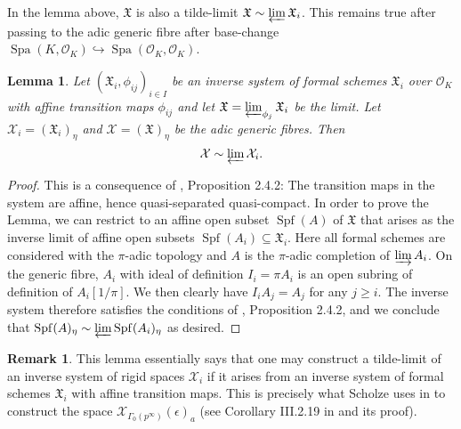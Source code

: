 \documentclass[10pt,oneside]{amsart}
\newtheorem{lemma}[theorem]{Lemma}
\theoremstyle{definition}
\newtheorem{remark}[theorem]{Remark}
\begin{document}
	In the lemma above, $\mathfrak X$ is also a tilde-limit  $\mathfrak X\sim \varprojlim \mathfrak X_i$. This remains true after passing to the adic generic fibre after base-change $\operatorname{Spa}(K,\mathcal O_K)\hookrightarrow \operatorname{Spa}(\mathcal O_K,\mathcal O_K)$.
	
	\begin{lemma}\label{tilde-limit from adic generic fibre of formal schemes}
		Let $(\mathfrak X_i,\phi_{ij})_{i\in I}$ be an inverse system of formal schemes $\mathfrak X_i$ over $\mathcal O_K$ with affine transition maps $\phi_{ij}$ and let $\mathfrak X=\varprojlim_{\phi_j} \mathfrak X_i$ be the limit. Let $\mathcal X_i =(\mathfrak X_i)_\eta$ and  $\mathcal X = (\mathfrak X)_\eta$ be the adic generic fibres. Then
		\[\mathcal X \sim \varprojlim \mathcal X_i.\]
	\end{lemma}
	\begin{proof}
		This is a consequence of \cite{SW}, Proposition 2.4.2: The transition maps in the system are affine, hence quasi-separated quasi-compact. In order to prove the Lemma, we can restrict to an affine open subset $\operatorname{Spf}(A)$ of $\mathfrak X$ that arises as the inverse limit of affine open subsets $\operatorname{Spf}(A_i)\subseteq \mathfrak X_i$. Here all formal schemes are considered with the $\pi$-adic topology and $A$ is the $\pi$-adic completion of $\varinjlim A_i$. 
		On the generic fibre, $A_i$ with ideal of definition $I_i=\pi A_i$ is an open subring of definition of $A_i[1/\pi]$. We then clearly have $I_iA_j = A_j$ for any $j\geq i$. The inverse system therefore satisfies the conditions of \cite{SW}, Proposition 2.4.2, and we conclude that $\operatorname{Spf}(A)_\eta \sim \varprojlim \operatorname{Spf}(A_i)_\eta$ as desired.
	\end{proof}
	
	\begin{remark}
	This lemma essentially says that one may construct a tilde-limit of an inverse system of rigid spaces $\mathcal X_i$ if it arises from an inverse system of formal schemes $\mathfrak X_i$ with affine transition maps. This is precisely what Scholze uses in \cite{torsion} to construct the space $\mathcal X_{\Gamma_0(p^\infty)}(\epsilon)_a$ (see Corollary III.2.19 in \cite{torsion} and its proof).
	\end{remark}
	
	
\end{document}
